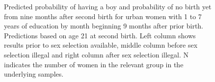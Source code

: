 \documentclass[12pt,letterpaper]{article}
\begin{document}
\begin{figure}[htpb]
\setcounter{subfigure}{3}
\caption{Predicted probability of having a boy and probability of
no birth yet from nine months after second birth for urban 
women with 1 to 7 years of education by month beginning 9 months after prior birth. 
Predictions based on age 21 at second birth.
Left column shows results prior to sex selection available, middle column before
sex selection illegal and right column after sex selection illegal.
N indicates the number of women in the relevant group in the underlying samples.
}
\label{fig:results_spell4_med_urban}
\end{figure}
\end{document}
